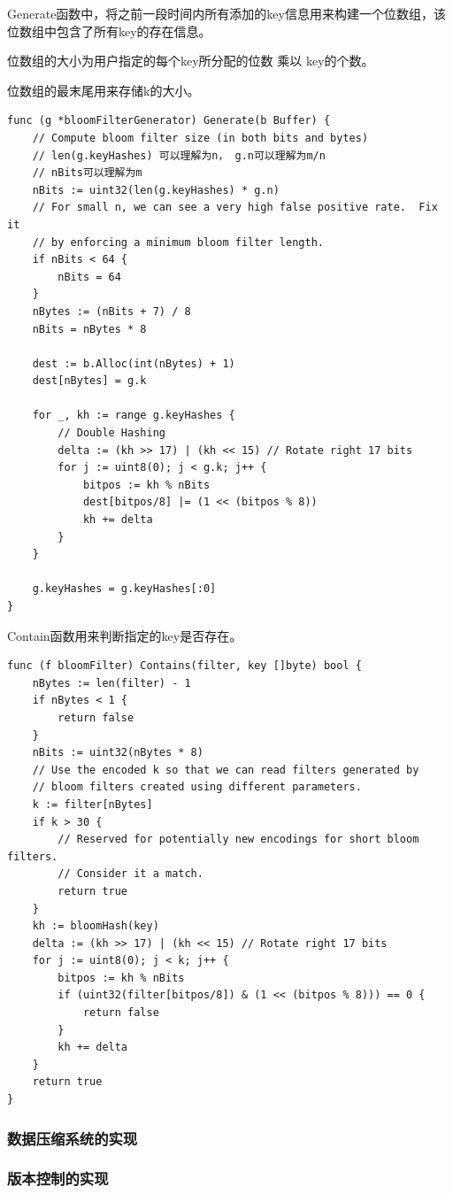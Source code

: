 \begin{enumerate}
Generate函数中，将之前一段时间内所有添加的key信息用来构建一个位数组，该位数组中包含了所有key的存在信息。

位数组的大小为用户指定的每个key所分配的位数 乘以 key的个数。

位数组的最末尾用来存储k的大小。

\begin{lstlisting}[caption=Generate , label=code_radds_storage_Generate]
func (g *bloomFilterGenerator) Generate(b Buffer) {
	// Compute bloom filter size (in both bits and bytes)
	// len(g.keyHashes) 可以理解为n， g.n可以理解为m/n
	// nBits可以理解为m
	nBits := uint32(len(g.keyHashes) * g.n)
	// For small n, we can see a very high false positive rate.  Fix it
	// by enforcing a minimum bloom filter length.
	if nBits < 64 {
		nBits = 64
	}
	nBytes := (nBits + 7) / 8
	nBits = nBytes * 8

	dest := b.Alloc(int(nBytes) + 1)
	dest[nBytes] = g.k

	for _, kh := range g.keyHashes {
		// Double Hashing
		delta := (kh >> 17) | (kh << 15) // Rotate right 17 bits
		for j := uint8(0); j < g.k; j++ {
			bitpos := kh % nBits
			dest[bitpos/8] |= (1 << (bitpos % 8))
			kh += delta
		}
	}

	g.keyHashes = g.keyHashes[:0]
}
\end{lstlisting}


Contain函数用来判断指定的key是否存在。

\begin{lstlisting}[caption=tFile , label=code_radds_storage_tfile]
func (f bloomFilter) Contains(filter, key []byte) bool {
	nBytes := len(filter) - 1
	if nBytes < 1 {
	    return false
	}
	nBits := uint32(nBytes * 8)
	// Use the encoded k so that we can read filters generated by
	// bloom filters created using different parameters.
	k := filter[nBytes]
	if k > 30 {
	    // Reserved for potentially new encodings for short bloom filters.
	    // Consider it a match.
	    return true
	}
	kh := bloomHash(key)
	delta := (kh >> 17) | (kh << 15) // Rotate right 17 bits
	for j := uint8(0); j < k; j++ {
	    bitpos := kh % nBits
	    if (uint32(filter[bitpos/8]) & (1 << (bitpos % 8))) == 0 {
	        return false
	    }
	    kh += delta
	}
	return true
}
\end{lstlisting}

		\end{enumerate}

		\subsubsection{数据压缩系统的实现}

		\subsubsection{版本控制的实现}

	